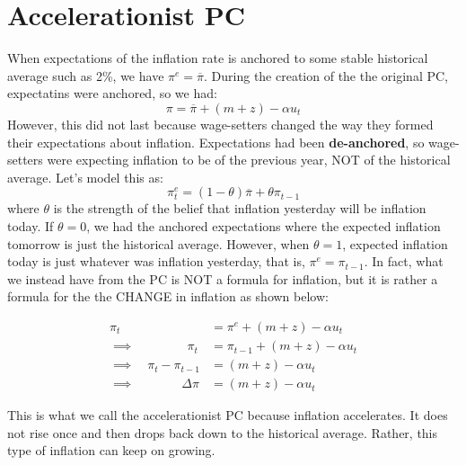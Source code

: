 \documentclass{extarticle}
\begin{document}
\section{Accelerationist PC}
When expectations of the inflation rate is anchored to some stable historical average such as 2\%, we have $\pi^e = \overline{\pi}$. During the creation of the the original PC, expectatins were anchored, so we had:
$$\pi = \overline{\pi} + (m+z) - \alpha u_t$$
However, this did not last because wage-setters changed the way they formed their expectations about inflation. Expectations had been \textbf{de-anchored}, so wage-setters were expecting inflation to be of the previous year, NOT of the historical average. Let's model this as:
$$\pi_t^e = (1 - \theta) \overline{\pi} + \theta \pi_{t-1}$$
where $\theta$ is the strength of the belief that inflation yesterday will be inflation today. If $\theta = 0$, we had the anchored expectations where the expected inflation tomorrow is just the historical average. 
However, when $\theta = 1$, expected inflation today is just whatever was inflation yesterday, that is, $\pi^e = \pi_{t-1}$. 
In fact, what we instead have from the PC is NOT a formula for inflation, but it is rather a formula for the the CHANGE in inflation as shown below:



\begin{align*}
    \pi_t               &= \pi^e + (m+z) - \alpha u_t \\
    \implies \quad \quad \quad \quad \, \pi_t  &= \pi_{t-1} + (m+z) - \alpha u_t \\
    \implies \quad \pi_t - \pi_{t-1} &= (m+z) - \alpha u_t \\
    \implies \quad \quad \quad \; \; \, \Delta \pi        &= (m+z) - \alpha u_t
\end{align*}

This is what we call the accelerationist PC because inflation accelerates. It does not rise once and then drops back down to the historical average. Rather, this type of inflation can keep on growing.
\end{document}
